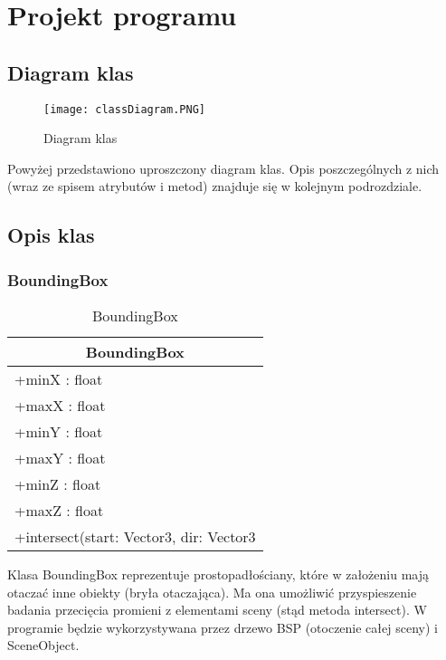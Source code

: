 \section{Projekt programu}

	\subsection{Diagram klas}
	\begin{figure}[H]
    \centering
              \texttt{[image: classDiagram.PNG]}
    \caption{Diagram klas}
    \label{fig:classDiagram}
	\end{figure}
	
	Powyżej przedstawiono uproszczony diagram klas. Opis poszczególnych z nich (wraz ze spisem atrybutów i metod) znajduje się w kolejnym podrozdziale.
	
\subsection{Opis klas}

\subsubsection{BoundingBox}


\footnotesize
\footnotesize
\begin{longtable}{|p{14cm}|}
	\caption{BoundingBox} \label{tab:BoundingBox} \\ \hline
	\multicolumn{1}{|c|}{BoundingBox} \\ \hline
    +minX : float \\
    +maxX : float \\
    +minY : float \\
    +maxY : float \\
    +minZ : float \\
    +maxZ : float \\ \hline
    +intersect(start: Vector3, dir: Vector3 \\ \hline
\end{longtable}
\normalsize

Klasa BoundingBox reprezentuje prostopadłościany, które w założeniu mają otaczać inne obiekty (bryła otaczająca). Ma ona umożliwić przyspieszenie badania przecięcia promieni z elementami sceny (stąd metoda intersect). W programie będzie wykorzystywana przez drzewo BSP (otoczenie całej sceny) i SceneObject. 


